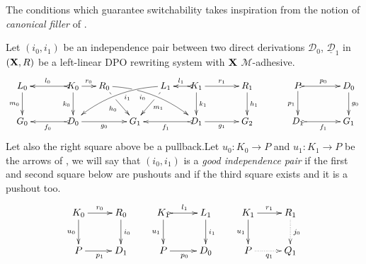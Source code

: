 \documentclass[a4paper,UKenglish,cleveref,pdftex, thm-restate,numberwithinsect]{lipics}
\def\R{\mathsf{R}}
\def\X{\textbf {\textup{X}}}
\newcommand{\dder}[1]{\mathscr{#1}}
\newcommand{\der}[1]{\underline{\dder{#1}}}
\begin{document}
The conditions which  guarantee switchability takes inspiration from the notion of \emph{canonical filler} of \cite{heindel2009category}.


\begin{definition}\label{def:filler}
	Let $(i_0, i_1)$ be an independence pair between two direct derivations $\dder{D}_0$, $\der{D}_1$ in $(\X, \R)$ be a left-linear DPO rewriting system with $\X$ $\mathcal{M}$-adhesive.
	\[\xymatrix@C=15pt{L_0 \ar[d]_{m_0}&& K_0 \ar[d]_{k_0}\ar@{>->}[ll]_{l_0} \ar[r]^{r_0} & R_0 \ar@/^.35cm/[drrr]|(.3)\hole_(.4){i_0} \ar[dr]|(.3)\hole_{h_0} && L_1 \ar@/_.35cm/[dlll]^(.4){i_1} \ar[dl]|(.3)\hole^{m_1}& K_1 \ar[d]^{k_1}\ar@{>->}[l]_{l_1} \ar[rr]^{r_1} && R_1 \ar[d]^{h_1} && P \ar@{>->}[rr]^{p_0} \ar[d]_{p_1}&& D_0\ar[d]^{g_0}\\G_0 && \ar@{>->}[ll]^{f_0} D_0 \ar[rr]_{g_0}&& G_1  && \ar@{>->}[ll]^{f_1} D_1 \ar[rr]_{g_1}&& G_2 &&  D_1 \ar@{>->}[rr]_{f_1} && G_1}\]
Let also the right square above be a pullback.Let $u_0\colon K_0\to P$ and $u_1\colon K_1\to P$ be the arrows of , we will say that $(i_0, i_1)$ is a \emph{good independence pair} if the first and second square below are pushouts and if the third square exists and it is a pushout too.
				\[\xymatrix{K_0 \ar[r]^{r_0}  \ar[d]_{u_0}& R_0 \ar[d]^{i_0} & K_1 \ar@{>->}[r]^{l_1}  \ar[d]_{u_1}& L_1 \ar[d]^{i_1}&K_1 \ar[r]^{r_1} \ar[d]_{u_1}& R_1\ar@{.>}[d]^{j_0} \\ P \ar[r]_{p_1} & D_1 &P \ar[r]_{p_0}  & D_0&P \ar@{.>}[r]_{q_1} & Q_1}\]
\end{definition}
\end{document}
